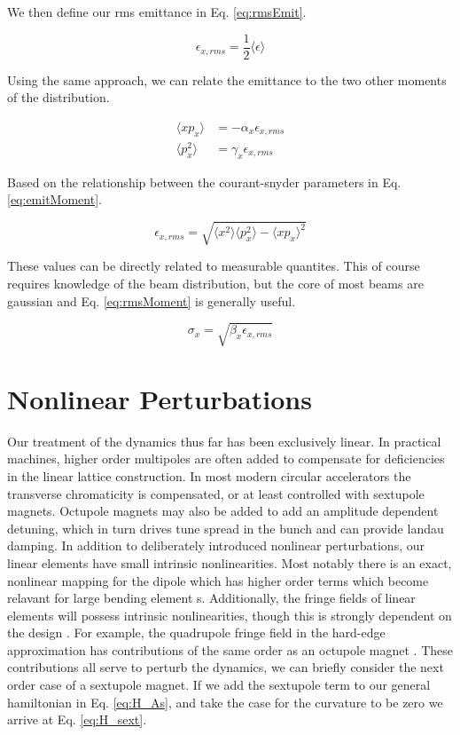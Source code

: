 We then define our rms emittance in Eq. \ref{eq:rmsEmit}. 

\begin{equation} \label{eq:rmsEmit}
	\epsilon_{x,rms} = \frac{1}{2} \langle \epsilon \rangle
\end{equation}

Using the same approach, we can relate the emittance to the two other moments of the distribution.

\begin{equation} \label{eq:momP2}
\begin{split}
	\langle x p_x \rangle &= -\alpha_x \epsilon_{x,rms}\\
	\langle p_x^2 \rangle &= \gamma_x \epsilon_{x,rms}
\end{split}
\end{equation}

Based on the relationship between the courant-snyder parameters in Eq. \ref{eq:emitMoment}.

\begin{equation} \label{eq:emitMoment}
	\epsilon_{x,rms} = \sqrt{\langle x^2 \rangle \langle p_x^2 \rangle - \langle x p_x \rangle^2}
\end{equation}

These values can be directly related to measurable quantites. This of course requires knowledge of the beam distribution, but the core of most beams are gaussian and Eq. \ref{eq:rmsMoment} is generally useful.

\begin{equation} \label{eq:rmsMoment}
	\sigma_x = \sqrt{\beta_x \epsilon_{x,rms}}
\end{equation}

\section{Nonlinear Perturbations} \label{sec:nonlinearPerturb}
Our treatment of the dynamics thus far has been exclusively linear. In practical machines, higher order multipoles are often added to compensate for deficiencies in the linear lattice construction. In most modern circular accelerators the transverse chromaticity is compensated, or at least controlled with sextupole magnets. Octupole magnets may also be added to add an amplitude dependent detuning, which in turn drives tune spread in the bunch and can provide landau damping. In addition to deliberately introduced nonlinear perturbations, our linear elements have small intrinsic nonlinearities. Most notably there is an exact, nonlinear mapping for the dipole which has higher order terms which become relavant for large bending element \cite{ExactSbend}s. Additionally, the fringe fields of linear elements will possess intrinsic nonlinearities, though this is strongly dependent on the design \cite{Baartman}. For example, the quadrupole fringe field in the hard-edge approximation has contributions of the same order as an octupole magnet \cite{Forrest}. These contributions all serve to perturb the dynamics, we can briefly consider the next order case of a sextupole magnet. If we add the sextupole term to our general hamiltonian in Eq. \ref{eq:H_As}, and take the case for the curvature to be zero we arrive at Eq. \ref{eq:H_sext}.

